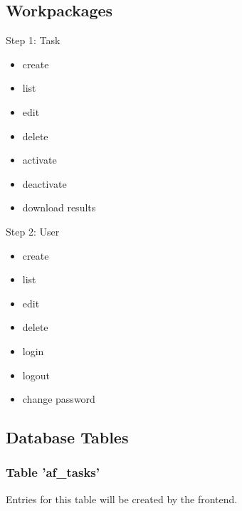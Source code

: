 \documentclass{article}
\begin{document}
\subsection{Workpackages}
\begin{minipage}{0.45\textwidth}
Step 1: Task
  \begin{itemize}
  \item create
  \item list
  \item edit
  \item delete
  \item activate
  \item deactivate
  \item download results
  \end{itemize}
\end{minipage}
\hfill
\begin{minipage}{0.45\textwidth}
Step 2: User
  \begin{itemize}
  \item create
  \item list
  \item edit
  \item delete
  \item login
  \item logout
  \item change password
  \end{itemize}
\end{minipage}

\subsection{Database Tables}\label{ch!database}
\subsubsection{Table 'af\_tasks'}
Entries for this table will be created by the frontend.
\end{document}
